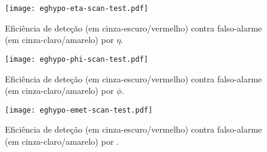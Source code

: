 \begin{figure}
\begin{center}
\texttt{[image: eghypo-eta-scan-test.pdf]}
\end{center}
\caption{Eficiência de deteção (em cinza-escuro/vermelho) contra
falso-alarme (em cinza-claro/amarelo) por $\eta$.}
\label{fig:eghypo-eta-scan-test}
\end{figure}

\begin{figure}
\begin{center}
\texttt{[image: eghypo-phi-scan-test.pdf]}
\end{center}
\caption{Eficiência de deteção (em cinza-escuro/vermelho) contra
falso-alarme (em cinza-claro/amarelo) por $\phi$.}
\label{fig:eghypo-phi-scan-test}
\end{figure}

\begin{figure}
\begin{center}
\texttt{[image: eghypo-emet-scan-test.pdf]}
\end{center}
\caption{Eficiência de deteção (em cinza-escuro/vermelho) contra
falso-alarme (em cinza-claro/amarelo) por \etem.}
\label{fig:eghypo-emet-scan-test}
\end{figure}






